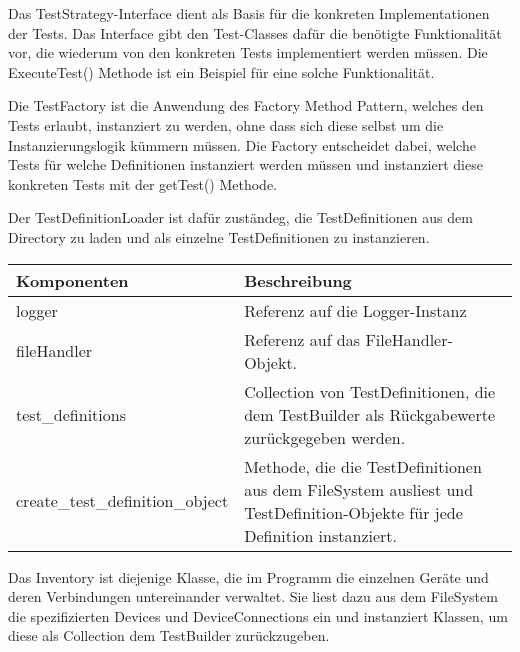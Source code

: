 \documentclass[]{subfiles}
\begin{document}
	Das TestStrategy-Interface dient als Basis für die konkreten Implementationen der Tests. 
	Das Interface gibt den Test-Classes dafür die benötigte Funktionalität vor, die wiederum von den konkreten Tests implementiert werden müssen.
	Die ExecuteTest() Methode ist ein Beispiel für eine solche Funktionalität.

	Die TestFactory ist die Anwendung des Factory Method Pattern, welches den Tests erlaubt, instanziert zu werden, ohne dass sich diese selbst um die Instanzierungslogik kümmern müssen.
	Die Factory entscheidet dabei, welche Tests für welche Definitionen instanziert werden müssen und instanziert diese konkreten Tests mit der getTest() Methode.

	\newpage

	Der TestDefinitionLoader ist dafür zuständeg, die TestDefinitionen aus dem Directory zu laden und als einzelne TestDefinitionen zu instanzieren.
	
	\begin{tabularx}{\textwidth}{lX}
		\toprule
			Komponenten & Beschreibung \\
		\midrule
			logger & Referenz auf die Logger-Instanz \\
			fileHandler & Referenz auf das FileHandler-Objekt. \\
			test\_definitions & Collection von TestDefinitionen, die dem TestBuilder als Rückgabewerte zurückgegeben werden. \\
		\midrule
			create\_test\_definition\_object & Methode, die die TestDefinitionen aus dem FileSystem ausliest und TestDefinition-Objekte für jede Definition instanziert. \\
		\bottomrule
	\end{tabularx}

	Das Inventory ist diejenige Klasse, die im Programm die einzelnen Geräte und deren Verbindungen untereinander verwaltet. 
	Sie liest dazu aus dem FileSystem die spezifizierten Devices und DeviceConnections ein und instanziert Klassen, um diese als Collection dem TestBuilder zurückzugeben.
\end{document}
